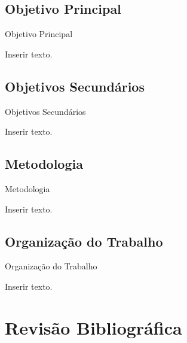 \documentclass[compress]{beamer}
\begin{document}
\subsection{Objetivo Principal}

\begin{frame}{Objetivo Principal}

Inserir texto.

\end{frame}


\subsection{Objetivos Secund\'arios}

\begin{frame}{Objetivos Secund\'arios}

Inserir texto.

\end{frame}


\subsection{Metodologia}

\begin{frame}{Metodologia}

Inserir texto.

\end{frame}


\subsection{Organiza\c c\~ao do Trabalho}

\begin{frame}{Organiza\c c\~ao do Trabalho}

Inserir texto.

\end{frame}


\section{Revis\~ao Bibliogr\'afica}
\end{document}
